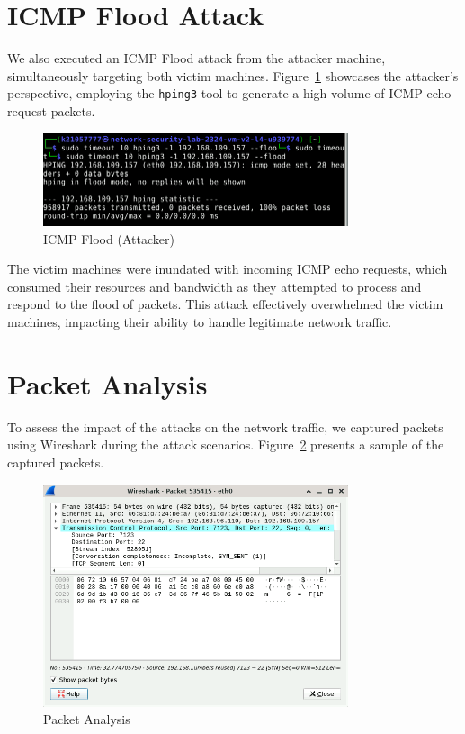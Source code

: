 \section{ICMP Flood Attack}
We also executed an ICMP Flood attack from the attacker machine, simultaneously targeting both victim machines. Figure~\ref{fig:ICMPFloodAttackerPOV} showcases the attacker's perspective, employing the \texttt{hping3} tool to generate a high volume of ICMP echo request packets.

\begin{figure}[H]
\centering
\includegraphics[width=0.8\textwidth]{img/level3/level3-attacker-ICMPFlood-pov.png}
\caption{ICMP Flood (Attacker)}\label{fig:ICMPFloodAttackerPOV}
\end{figure}

The victim machines were inundated with incoming ICMP echo requests, which consumed their resources and bandwidth as they attempted to process and respond to the flood of packets. This attack effectively overwhelmed the victim machines, impacting their ability to handle legitimate network traffic.

\section{Packet Analysis}
To assess the impact of the attacks on the network traffic, we captured packets using Wireshark during the attack scenarios. Figure~\ref{fig:PacketAnalysis} presents a sample of the captured packets.

\begin{figure}[H]
\centering
\includegraphics[width=0.8\textwidth]{img/level3/level3-packet-analysis.png}
\caption{Packet Analysis}\label{fig:PacketAnalysis}
\end{figure}

